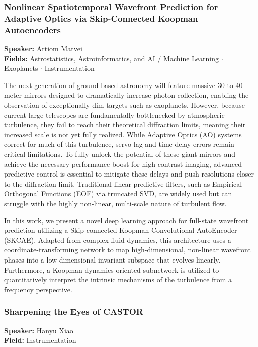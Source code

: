 \hypertarget{abstract-talk-335}{}\label{abstract-page-talk-335}
\subsubsection*{Nonlinear Spatiotemporal Wavefront Prediction for Adaptive Optics via Skip-Connected Koopman Autoencoders}
\textbf{Speaker:} Artiom Matvei\\
\textbf{Fields:} Astrostatistics, Astroinformatics, and AI / Machine Learning $\cdot$ Exoplanets $\cdot$ Instrumentation

The next generation of ground-based astronomy will feature massive 30-to-40-meter mirrors designed to dramatically increase photon collection, enabling the observation of exceptionally dim targets such as exoplanets. However, because current large telescopes are fundamentally bottlenecked by atmospheric turbulence, they fail to reach their theoretical diffraction limits, meaning their increased scale is not yet fully realized. While Adaptive Optics (AO) systems correct for much of this turbulence, servo-lag and time-delay errors remain critical limitations. To fully unlock the potential of these giant mirrors and achieve the necessary performance boost for high-contrast imaging, advanced predictive control is essential to mitigate these delays and push resolutions closer to the diffraction limit. Traditional linear predictive filters, such as Empirical Orthogonal Functions (EOF) via truncated SVD, are widely used but can struggle with the highly non-linear, multi-scale nature of turbulent flow.

In this work, we present a novel deep learning approach for full-state wavefront prediction utilizing a Skip-connected Koopman Convolutional AutoEncoder (SKCAE). Adapted from complex fluid dynamics, this architecture uses a coordinate-transforming network to map high-dimensional, non-linear wavefront phases into a low-dimensional invariant subspace that evolves linearly. Furthermore, a Koopman dynamics-oriented subnetwork is utilized to quantitatively interpret the intrinsic mechanisms of the turbulence from a frequency perspective.

\hypertarget{abstract-talk-259}{}\label{abstract-page-talk-259}
\subsubsection*{Sharpening the Eyes of CASTOR}
\textbf{Speaker:} Hanyu Xiao\\
\textbf{Field:} Instrumentation

